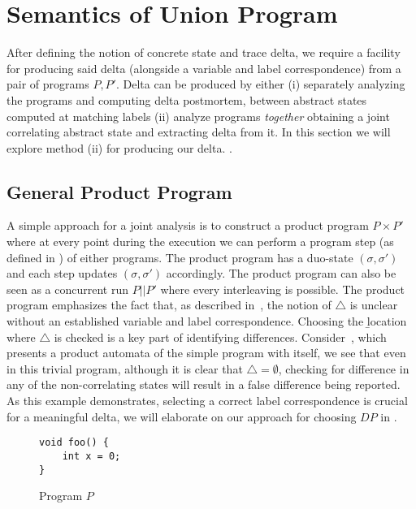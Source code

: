 \section{Semantics of Union Program} 
After defining the notion of concrete state and trace delta, we require a facility for producing said delta (alongside a variable and label correspondence) from a pair of programs $P,P'$. Delta can be produced by either (i) separately analyzing the programs and computing delta postmortem, between abstract states computed at matching labels (ii) analyze programs \emph{together} obtaining a joint correlating abstract state and extracting delta from it. In this section we will explore method (ii) for producing our delta. .

\subsection{General Product Program} 
A simple approach for a joint analysis is to construct a product program $P \times P'$ where at every point during the execution we can perform a program step (as defined in ) of either programs. The product program has a duo-state $(\sigma,\sigma')$ and each step updates $(\sigma,\sigma')$ accordingly. The product program can also be seen as a concurrent run $P||P'$ where every interleaving is possible. The product program emphasizes the fact that, as described in~, the notion of $\triangle$ is unclear without an established variable and label correspondence. Choosing the \b{location} where $\triangle$ is checked is a key part of identifying differences. Consider~, which presents a product automata of the simple program with itself, we see that even in this trivial program, although it is clear that $\triangle = \emptyset$, checking for difference in any of the non-correlating states will result in a false difference being reported. As this example demonstrates, selecting a correct label correspondence is crucial for a meaningful delta, we will elaborate on our approach for choosing $DP$ in .

\begin{figure}[ht] 
\begin{lstlisting}
void foo() {
    int x = 0;
}
\end{lstlisting}
\caption{Program $P$}
\centering
\end{figure}

